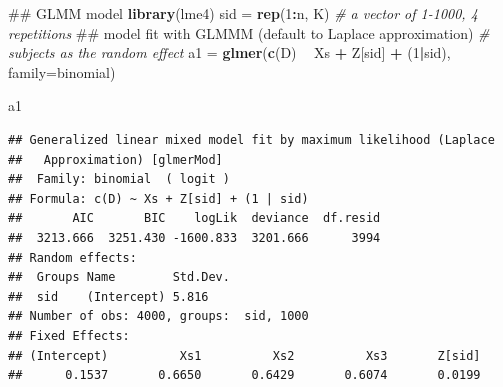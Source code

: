 \documentclass[]{book}
\newenvironment{Shaded}{\begin{snugshade}}{\end{snugshade}}
\newcommand{\KeywordTok}[1]{\textcolor[rgb]{0.13,0.29,0.53}{\textbf{#1}}}
\newcommand{\DataTypeTok}[1]{\textcolor[rgb]{0.13,0.29,0.53}{#1}}
\newcommand{\DecValTok}[1]{\textcolor[rgb]{0.00,0.00,0.81}{#1}}
\newcommand{\StringTok}[1]{\textcolor[rgb]{0.31,0.60,0.02}{#1}}
\newcommand{\CommentTok}[1]{\textcolor[rgb]{0.56,0.35,0.01}{\textit{#1}}}
\newcommand{\OperatorTok}[1]{\textcolor[rgb]{0.81,0.36,0.00}{\textbf{#1}}}
\newcommand{\NormalTok}[1]{#1}
\begin{document}
\begin{Shaded}
\begin{Highlighting}[]
\NormalTok{## GLMM model}
\KeywordTok{library}\NormalTok{(lme4)}
\NormalTok{sid =}\StringTok{ }\KeywordTok{rep}\NormalTok{(}\DecValTok{1}\OperatorTok{:}\NormalTok{n, K) }\CommentTok{# a vector of 1-1000, 4 repetitions}
\NormalTok{## model fit with GLMMM (default to Laplace approximation)}
\CommentTok{# subjects as the random effect}
\NormalTok{a1 =}\StringTok{ }\KeywordTok{glmer}\NormalTok{(}\KeywordTok{c}\NormalTok{(D) }\OperatorTok{~}\StringTok{ }\NormalTok{Xs }\OperatorTok{+}\StringTok{ }\NormalTok{Z[sid] }\OperatorTok{+}\StringTok{ }\NormalTok{(}\DecValTok{1}\OperatorTok{|}\NormalTok{sid), }\DataTypeTok{family=}\NormalTok{binomial)}

\NormalTok{a1}
\end{Highlighting}
\end{Shaded}

\begin{verbatim}
## Generalized linear mixed model fit by maximum likelihood (Laplace
##   Approximation) [glmerMod]
##  Family: binomial  ( logit )
## Formula: c(D) ~ Xs + Z[sid] + (1 | sid)
##       AIC       BIC    logLik  deviance  df.resid 
##  3213.666  3251.430 -1600.833  3201.666      3994 
## Random effects:
##  Groups Name        Std.Dev.
##  sid    (Intercept) 5.816   
## Number of obs: 4000, groups:  sid, 1000
## Fixed Effects:
## (Intercept)          Xs1          Xs2          Xs3       Z[sid]  
##      0.1537       0.6650       0.6429       0.6074       0.0199
\end{verbatim}
\end{document}
